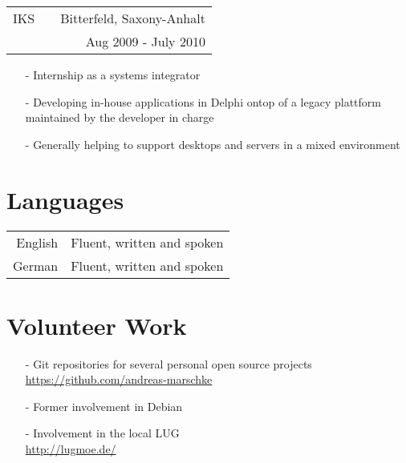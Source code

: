 \documentclass[11pt]{article}
\begin{document}
\begin{tabular}{@{ } l @{} p{3.6cm} @{} r @{ }}
  IKS & & Bitterfeld, Saxony-Anhalt \\
  & & Aug 2009 - July 2010 \\
\end{tabular}

\begin{itemize}
  \item[-] Internship as a systems integrator
  \item[-] Developing in-house applications in Delphi ontop of a
    legacy plattform maintained by the developer in charge 
  \item[-] Generally helping to support desktops and servers in a
    mixed environment
\end{itemize}

\thispagestyle{empty}

\pagebreak
\section*{Languages}

\begin{tabular}{@{} r @{ : } l @{}}
  English & Fluent, written and spoken \\
  German  & Fluent, written and spoken \\
\end{tabular}

\section*{Volunteer Work}
\begin{itemize}
  \item[-] Git repositories for several personal open source projects \\
    \url{https://github.com/andreas-marschke}
  \item[-] Former involvement in Debian
  \item[-] Involvement in the local LUG \\
    \url{http://lugmoe.de/}
\end{itemize}

\thispagestyle{empty}
\end{document}
